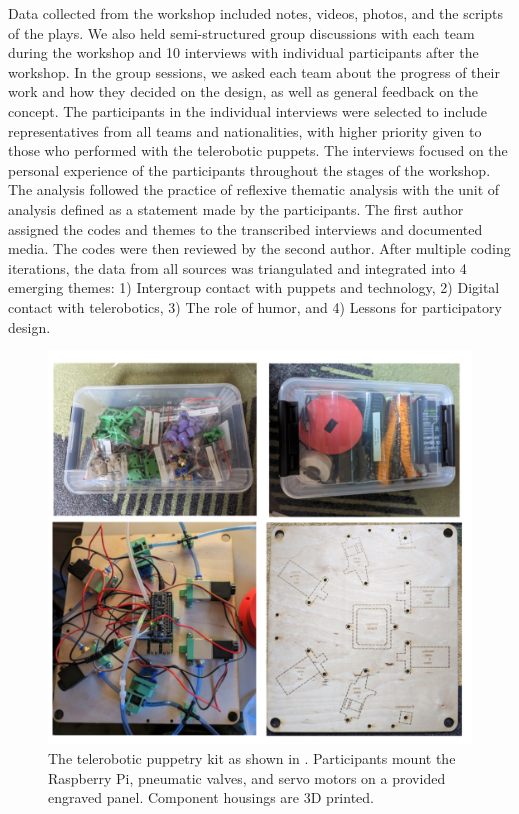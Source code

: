 \documentclass[dissertation,math,vertlayout,pdfa,colorlinks]{aaltoseries}
\begin{document}
Data collected from the workshop included notes, videos, photos, and the scripts of the plays. We also held semi-structured group discussions with each team during the workshop and 10 interviews with individual participants after the workshop. In the group sessions, we asked each team about the progress of their work and how they decided on the design, as well as general feedback on the concept. The participants in the individual interviews were selected to include representatives from all teams and nationalities, with higher priority given to those who performed with the telerobotic puppets. The interviews focused on the personal experience of the participants throughout the stages of the workshop. The analysis followed the practice of reflexive thematic analysis \cite{braunUsingThematicAnalysis2006,braunReflectingReflexiveThematic2019} with the unit of analysis defined as a statement made by the participants. The first author assigned the codes and themes to the transcribed interviews and documented media. The codes were then reviewed by the second author. After multiple coding iterations, the data from all sources was triangulated \cite{guionTriangulationEstablishingValidity2011} and integrated into 4 emerging themes: 1) Intergroup contact with puppets and technology, 2) Digital contact with telerobotics, 3) The role of humor, and 4) Lessons for participatory design.

\begin{figure}
    \centering
    \includegraphics[width=1\linewidth]{puppetry-kit.png}
    \caption{The telerobotic puppetry kit as shown in \cite{peledTeleroboticTheaterOppressed2025}. Participants mount the Raspberry Pi, pneumatic valves, and servo motors on a provided engraved panel. Component housings are 3D printed.}
    \label{fig:telepupetry-kit}
\end{figure}
\end{document}
